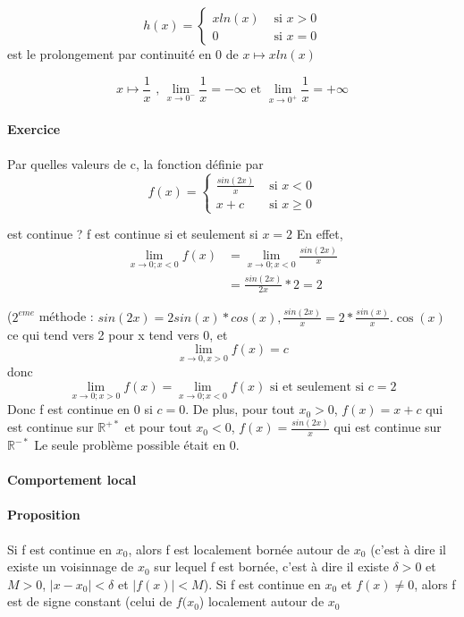 \[h(x) =
	\left\{
			\begin{array}{rl}
				xln(x) & \text{ si } x > 0 \\
				0&\text{ si } x = 0
			\end{array}
			\right.
		\]
		est le prolongement par continuité en 0 de $x\mapsto xln(x)$

		\[x \mapsto \frac{1}{x} \text{ , } \lim_{x \to 0^-} \frac{1}{x} = -\infty \text{ et }
			\lim_{x \to 0^+} \frac{1}{x} = +\infty \]

\paragraph{Exercice} Par quelles valeurs de c, la fonction définie par 
\[f(x) =
	\left\{
			\begin{array}{rl}
				\frac{sin(2x)}{x} & \text{ si } x < 0 \\
				x+c&\text{ si } x \geq 0
			\end{array}
			\right.
		\]

		est continue ? f est continue si et seulement si $x=2$ En effet, \begin{align*} 
			\lim_{x\to 0; x < 0} f(x) &= \lim_{x\to 0; x <0} \frac{sin(2x)}{x} \\
									  &= \frac{sin(2x)}{2x} * 2 = 2
		\end{align*}

		($2^{eme}$ méthode : $sin(2x) = 2sin(x)*cos(x), \frac{sin(2x)}{x} = 2*\frac{sin(x)}{x}.\cos(x)$ ce qui tend vers 2 pour x tend vers 0, et \[\lim_{x\to 0, x > 0} f(x) = c\] donc \[\lim_{x\to 0; x > 0} f(x) = \lim_{x\to 0; x<0} f(x) \text{ si et seulement si } c =2\]
		Donc f est continue en 0 si $c=0$. De plus, pour tout $x_0 > 0$, $f(x) = x+c$ qui est continue sur $\mathbb{R}^{+*}$ et pour tout $x_0 < 0$, $f(x) = \frac{sin(2x)}{x}$ qui est continue sur $\mathbb{R}^{-*}$
		Le seule problème possible était en 0.

\paragraph{Comportement local}
\paragraph{Proposition} Si f est continue en $x_0$, alors f est localement bornée autour de $x_0$ (c'est à dire il existe un voisinnage de $x_0$ sur lequel f est bornée, c'est à dire il existe $\delta > 0$ et $M > 0$, $|x-x_0| < \delta$ et $|f(x)| < M$).
Si f est continue en $x_0$ et $f(x) \neq 0$, alors f est de signe constant (celui de $f(x_0$) localement autour de $x_0$

